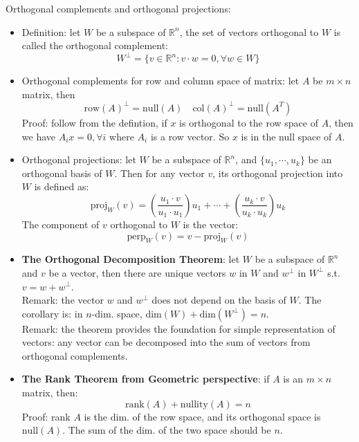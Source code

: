 \documentclass{report}
\begin{document}
Orthogonal complements and orthogonal projections: 
\begin{itemize}
\item Definition: let $W$ be a subspace of $\mathbb{R}^n$, the set of vectors orthogonal to $W$ is called the orthogonal complement: 
\begin{equation}
W^{\perp} = \{ v \in \mathbb{R}^n: v \cdot w = 0, \forall w \in W \}
\end{equation}

\item Orthogonal complements for row and column space of matrix: let $A$ be $m \times n$ matrix, then
\begin{equation}
\text{row}(A)^{\perp} = \text{null}(A) \quad \text{col}(A)^{\perp} = \text{null}(A^T)
\end{equation}
Proof: follow from the defintion, if $x$ is orthogonal to the row space of $A$, then we have $A_i x = 0, \forall i$ where $A_i$ is a row vector. So $x$ is in the null space of $A$. 

\item Orthogonal projections: let $W$ be a subspace of $\mathbb{R}^n$, and $\{u_1, \cdots, u_k\}$ be an orthogonal basis of $W$. Then for any vector $v$, its orthogonal projection into $W$ is defined as:
\begin{equation}
\text{proj}_W(v) = \left( \frac{u_1 \cdot v}{u_1 \cdot u_1} \right) u_1 + \cdots + \left( \frac{u_k \cdot v}{u_k \cdot u_k} \right) u_k 
\end{equation}
The component of $v$ orthogonal to $W$ is the vector: 
\begin{equation}
\text{perp}_W(v) = v - \text{proj}_W(v)
\end{equation}

\item \textbf{The Orthogonal Decomposition Theorem}: let $W$ be a subspace of $\mathbb{R}^n$ and $v$ be a vector, then there are unique vectors $w$ in $W$ and $w^{\perp}$ in $W^{\perp}$ s.t. $v = w + w^{\perp}$. \\
Remark: the vector $w$ and $w^{\perp}$ does not depend on the basis of $W$. The corollary is: in $n$-dim. space, $\text{dim}(W) + \text{dim}(W^{\perp}) = n$. \\
Remark: the theorem provides the foundation for simple representation of vectors: any vector can be decomposed into the sum of vectors from orthogonal complements. 

\item \textbf{The Rank Theorem from Geometric perspective}: if $A$ is an $m \times n$ matrix, then: 
\begin{equation}
\text{rank}(A) + \text{nullity}(A) = n
\end{equation}
Proof: rank $A$ is the dim. of the row space, and its orthogonal space is $\text{null}(A)$. The sum of the dim. of the two space should be $n$.  

\end{itemize}
\end{document}
